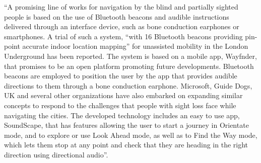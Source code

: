 ``A promising line of works for navigation by the blind and partially sighted people is based on the use of Bluetooth beacons and audible instructions delivered
through an interface device, such as bone conduction earphones or smartphones. A
trial of such a system, “with 16 Bluetooth beacons providing pin-point accurate
indoor location mapping” for unassisted mobility in the London Underground has
been reported. The system is based on a mobile app, Wayfnder, that promises
to be an open platform promoting future developments. Bluetooth beacons are
employed to position the user by the app that provides audible directions to them
through a bone conduction earphone.
Microsoft, Guide Dogs, UK and several other organizations have also embarked
on expanding similar concepts to respond to the challenges that people with sight
loss face while navigating the cities. The developed technology includes an
easy to use app, SoundScape, that has features allowing the user to start a journey in
Orientate mode, and to explore or use Look Ahead mode, as well as to Find the Way
mode, which lets them stop at any point and check that they are heading in the right
direction using directional audio''. 

